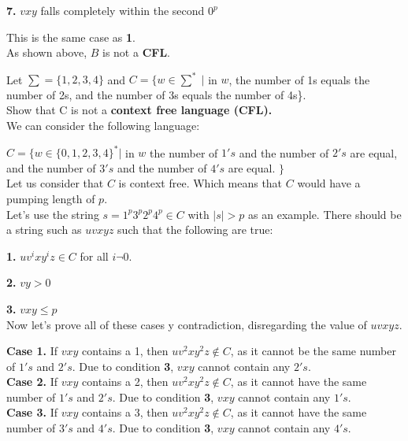 \documentclass[12pt]{article}
\begin{document}
\textbf{7.} $vxy$ falls completely within the second $0^p$

This is the same case as \textbf{1}. \\

As shown above, $B$ is not a \textbf{CFL}.

 Let $\sum = \{1, 2, 3, 4\}$ and $C = \{w \in \sum^* \; | $ in $w$, the number of 1s
equals the number of 2s, and the number of 3s equals the number of 4s\}. \\
Show that C is not a \textbf{context free language (CFL).} \\

We can consider the following language:

$C = \{ w \in \{0, 1, 2, 3, 4 \}^* | $ in $w$ the number of $1's$ and the number of
$2's$ are equal, and the number of $3's$ and the number of $4's$ are equal. $\}$ \\

Let us consider that $C$ is context free. Which means that $C$ would have a pumping
length of $p$. \\

Let's use the string $s = 1^p 3^p 2^p 4^p \in C$ with $|s| > p$ as an example.
There should be a string such as $uvxyz$ such that the following are true:

\textbf{1.} $u v^i x y^i z \in C$ for all $i \neg 0$.

\textbf{2.} $vy > 0$

\textbf{3.} $vxy \le p$ \\

Now let's prove all of these cases y contradiction, disregarding the value of $uvxyz$.

\textbf{Case 1.} If $vxy$ contains a 1, then $u v^2 x y^2 z \notin C$, as it cannot
be the same number of $1's$ and $2's$. Due to condition \textbf{3}, $vxy$ cannot
contain any $2's$. \\

\textbf{Case 2.} If $vxy$ contains a 2, then $u v^2 x y^2 z \notin C$, as it cannot
have the same number of $1's$ and $2's$. Due to condition \textbf{3}, $vxy$ cannot
contain any $1's$. \\

\textbf{Case 3.} If $vxy$ contains a 3, then $u v^2 x y^2 z \notin C$, as it cannot
have the same number of $3's$ and $4's$. Due to condition \textbf{3}, $vxy$ cannot
contain any $4's$. \\
\end{document}
